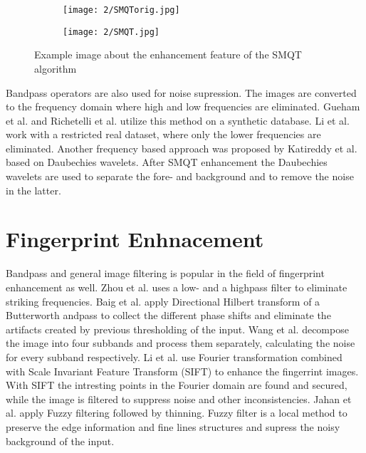 \documentclass[draft,final]{vutinfth} %
\begin{document}
\begin{figure}[h]
  \centering
  \begin{subfigure}[b]{0.4\columnwidth}
    \centering
    \texttt{[image: 2/SMQTorig.jpg]}
    \label{fig:rw:SMQTin}
  \end{subfigure}
  \begin{subfigure}[b]{0.4\columnwidth}
    \centering
    \texttt{[image: 2/SMQT.jpg]}
    \label{fig:rw:SMQTout}
  \end{subfigure}
  \caption{Example image about the enhancement feature of the SMQT algorithm \cite{katireddy2017novel} }
  \label{fig:rw:SMQT} %
\end{figure}

\par
Bandpass operators are also used for noise supression.
The images are converted to the frequency domain where high and low frequencies are eliminated.
Gueham et al. \cite{gueham2007automatic} and Richetelli et al. \cite{richetelli2017classification} utilize this method on a synthetic database.
Li et al. \cite{li2014retrieval} work with a restricted real dataset, where only the lower frequencies are eliminated.
Another frequency based approach was proposed by Katireddy et al. \cite{katireddy2017novel} based on Daubechies wavelets.
After SMQT enhancement the Daubechies wavelets are used to separate the fore- and background and to remove the noise in the latter.

\section*{Fingerprint Enhnacement}

Bandpass and general image filtering is popular in the field of fingerprint enhancement as well.
Zhou et al. \cite{zhou2011adaptive} uses a low- and a highpass filter to eliminate striking frequencies. 
Baig et al. \cite{baig2015enhancement} apply Directional Hilbert transform of a Butterworth andpass to collect the different phase shifts and eliminate the artifacts created by previous thresholding of the input.
Wang et al. \cite{wang2014enhanced} decompose the image into four subbands and process them separately, calculating the noise for every subband respectively.
Li et al. \cite{li2012texture} use Fourier transformation combined with Scale Invariant Feature Transform (SIFT) to enhance the fingerrint images. 
With SIFT the intresting points in the Fourier domain are found and secured, while the image is filtered to suppress noise and other inconsistencies.
Jahan et al. \cite{jahan2017robust} apply Fuzzy filtering followed by thinning.
Fuzzy filter is a local method to preserve the edge information and fine lines structures and supress the noisy background of the input.
\end{document}
